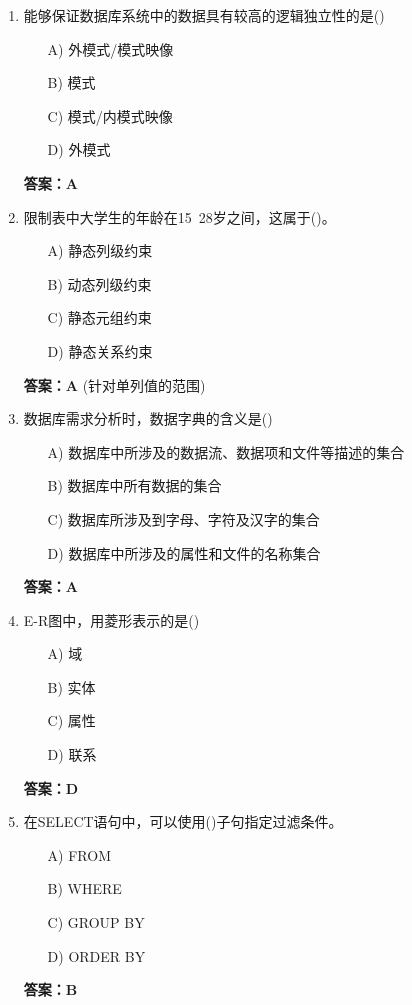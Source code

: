 \documentclass[a4paper,12pt]{article}
\begin{document}
\begin{enumerate}[label=\arabic*.]
\item 能够保证数据库系统中的数据具有较高的逻辑独立性的是()
\begin{itemize}
    \item[A)] 外模式/模式映像
    \item[B)] 模式
    \item[C)] 模式/内模式映像
    \item[D)] 外模式
\end{itemize}
\textbf{答案：A}

\item 限制表中大学生的年龄在15~28岁之间，这属于()。
\begin{itemize}
    \item[A)] 静态列级约束
    \item[B)] 动态列级约束
    \item[C)] 静态元组约束
    \item[D)] 静态关系约束
\end{itemize}
\textbf{答案：A} (针对单列值的范围)

\item 数据库需求分析时，数据字典的含义是()
\begin{itemize}
    \item[A)] 数据库中所涉及的数据流、数据项和文件等描述的集合
    \item[B)] 数据库中所有数据的集合
    \item[C)] 数据库所涉及到字母、字符及汉字的集合
    \item[D)] 数据库中所涉及的属性和文件的名称集合
\end{itemize}
\textbf{答案：A}

\item E-R图中，用菱形表示的是()
\begin{itemize}
    \item[A)] 域
    \item[B)] 实体
    \item[C)] 属性
    \item[D)] 联系
\end{itemize}
\textbf{答案：D}

\item 在SELECT语句中，可以使用()子句指定过滤条件。
\begin{itemize}
    \item[A)] FROM
    \item[B)] WHERE
    \item[C)] GROUP BY
    \item[D)] ORDER BY
\end{itemize}
\textbf{答案：B}


\end{enumerate}
\end{document}
